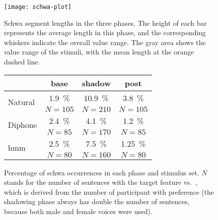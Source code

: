 \begin{figure}[t]
	\begin{minipage}{.48\linewidth}
			\centering
			\texttt{[image: schwa-plot]}
			\caption[Illustration]
				{Schwa segment lengths in the three phases.
				 The height of each bar represents the average length in this phase, and the corresponding whiskers indicate the overall value range.
				 The gray area shows the value range of the stimuli, with the mean length at the orange dashed line.}
			\label{fig:schwa_conv_bars}
	\end{minipage}
	\hfill
	\begin{minipage}{.49\linewidth}
			\centering
			\captionsetup{type=table}
			\caption[Convergence results for \textipa{[\s{n}]} vs.\ \textipa{[@n]} with three stimuli sets]
				{Percentage of schwa occurrences in each phase and stimulus set.
				 $N$ stands for the number of sentences with the target feature \textipa{[\s{n}]} vs.\ \textipa{[@n]}, which is derived from the number of participant with \textipa{[\s{n}]} preference (the shadowing phase always has double the number of sentences, because both male and female voices were used).}
			\label{tab:schwa_results}
			\begin{tabularx}{\linewidth}{lccc}
				\toprule
				& \textbf{base} & \textbf{shadow} & \textbf{post} \\
				\midrule
				\multirow{2}{1.4cm}{Natural}	& \SI{1.9}{\percent} & \SI{10.9}{\percent} & \SI{3.8}{\percent}  \\\vspace{0.3cm}
											& $ N = 105 $ 		 & $ N = 210 $		   & $ N = 105 $		 \\
				\multirow{2}{1.4cm}{Diphone} 	& \SI{2.4}{\percent} & \SI{4.1}{\percent}  & \SI{1.2}{\percent}  \\\vspace{0.3cm}
											& $ N = 85 $ 		 & $ N = 170 $ 		   & $ N = 85 $			 \\
				\multirow{2}{1.4cm}{\acs{hmm}} 	& \SI{2.5}{\percent} & \SI{7.5}{\percent}  & \SI{1.25}{\percent} \\
											& $ N = 80 $ 		 & $ N = 160 $ 		   & $ N = 80 $			 \\
				\bottomrule
			\end{tabularx}
	\end{minipage}
\end{figure}


